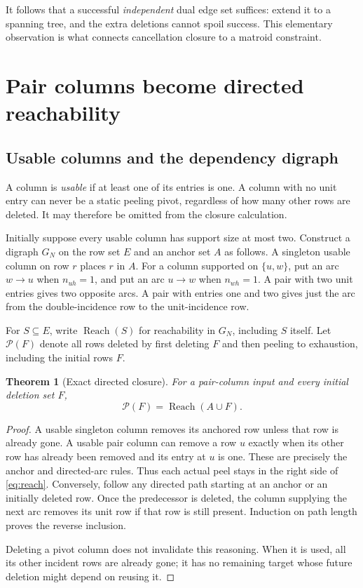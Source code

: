 \documentclass[11pt,letterpaper]{article}
\newtheorem{theorem}{Theorem}[section]
\theoremstyle{definition}
\theoremstyle{remark}
\DeclareMathOperator{\Reach}{Reach}
\begin{document}
It follows that a successful \emph{independent} dual edge set suffices: extend it
to a spanning tree, and the extra deletions cannot spoil success. This elementary
observation is what connects cancellation closure to a matroid constraint.

\section{Pair columns become directed reachability}\label{sec:reachability}
\subsection{Usable columns and the dependency digraph}
A column is \emph{usable} if at least one of its entries is one. A column with no
unit entry can never be a static peeling pivot, regardless of how many other rows
are deleted. It may therefore be omitted from the closure calculation.

Initially suppose every usable column has support size at most two. Construct a
digraph $G_N$ on the row set $E$ and an anchor set $A$ as follows. A singleton
usable column on row $r$ places $r$ in $A$. For a column supported on
$\{u,w\}$, put an arc $w\to u$ when $n_{uh}=1$, and put an arc $u\to w$ when
$n_{wh}=1$. A pair with two unit entries gives two opposite arcs. A pair with
entries one and two gives just the arc from the double-incidence row to the
unit-incidence row.

For $S\subseteq E$, write $\Reach(S)$ for reachability in $G_N$, including $S$
itself. Let $\mathcal P(F)$ denote all rows deleted by first deleting $F$ and
then peeling to exhaustion, including the initial rows $F$.

\begin{theorem}[Exact directed closure]\label{thm:reach}
For a pair-column input and every initial deletion set $F$,
\begin{equation}\label{eq:reach}
 \mathcal P(F)=\Reach(A\cup F).
\end{equation}
\end{theorem}
\begin{proof}
A usable singleton column removes its anchored row unless that row is already
gone. A usable pair column can remove a row $u$ exactly when its other row has
already been removed and its entry at $u$ is one. These are precisely the anchor
and directed-arc rules. Thus each actual peel stays in the right side of
\eqref{eq:reach}. Conversely, follow any directed path starting at an anchor or
an initially deleted row. Once the predecessor is deleted, the column supplying
the next arc removes its unit row if that row is still present. Induction on path
length proves the reverse inclusion.

Deleting a pivot column does not invalidate this reasoning. When it is used, all
its other incident rows are already gone; it has no remaining target whose future
deletion might depend on reusing it.
\end{proof}
\end{document}
